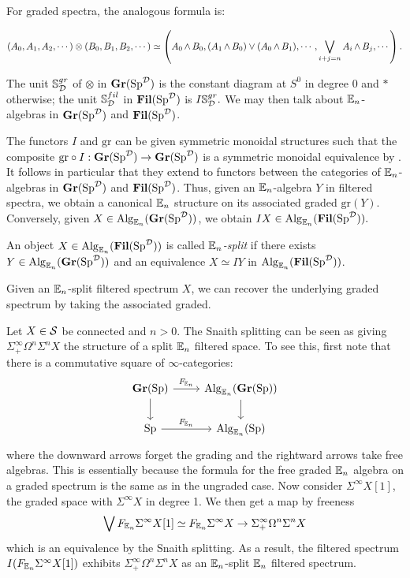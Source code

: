 For graded spectra, the analogous formula is:

$$(A_0,A_1,A_2,\cdots) \otimes (B_0,B_1,B_2,\cdots) \simeq \left( A_0 \smsh B_0, (A_1 \smsh B_0) \vee (A_0 \smsh B_1), \cdots, \bigvee_{i+j=n} A_i \smsh B_j, \cdots \right).$$


The unit $\mathbb{S}^{gr}_{\D}$ of $\otimes$ in $\Gr(\Sp^{\D})$ is the constant diagram at $S^0$ in degree 0 and $*$ otherwise; the unit $\mathbb{S}^{fil}_{\D}$ in $\Fil(\Sp^{\D})$ is $I\mathbb{S}^{gr}_{\D}.$  We may then talk about $\E_n$-algebras in $\Gr(\Sp^{\D})$ and $\Fil(\Sp^{\D})$.  


The functors $I$ and $\text{gr}$ can be given symmetric monoidal structures such that the composite $\text{gr}\circ I : \Gr(\Sp^{\D}) \to \Gr(\Sp^{\D})$ is a symmetric monoidal equivalence by \cite[Proposition 3.2.1]{LurieRot}.  It follows in particular that they extend to functors between the categories of $\E_n$-algebras in $\Gr(\Sp^{\D})$ and $\Fil(\Sp^{\D})$.  Thus, given an $\E_n$-algebra $Y$ in filtered spectra, we obtain a canonical $\E_n$ structure on its associated graded $\text{gr}(Y).$  Conversely, given $X\in \Alg_{\E_n}(\Gr(\Sp^{\D}))$, we obtain $IX\in \Alg_{\E_n}(\Fil(\Sp^{\D})).$  

\begin{dfn}
An object $X\in \Alg_{\E_n}(\Fil(\Sp^{\D}))$ is called \emph{$\E_n$-split} if there exists $Y\in \Alg_{\E_n}(\Gr(\Sp^{\D}))$ and an equivalence $X \simeq IY$ in $\Alg_{\E_n}(\Fil(\Sp^{\D}))$.  
\end{dfn}

Given an $\E_n$-split filtered spectrum $X$, we can recover the underlying graded spectrum by taking the associated graded.  

\begin{exm}\label{exm:snaith}
Let $X\in \cS$ be connected and $n>0$.  The Snaith splitting can be seen as giving $\Sigma^{\infty}_+ \Omega^n \Sigma^n X$ the structure of a split $\E_n$ filtered space.  To see this, first note that there is a commutative square of $\infty$-categories:
$$
\begin{tikzcd}
\Gr(\Sp) \arrow[d]\arrow[r,"F_{\E_n}"]&  \Alg_{\E_n}(\Gr(\Sp)) \arrow[d]\\
\Sp \arrow[r,"F_{\E_n}"] & \Alg_{\E_n}(\Sp) 
\end{tikzcd}
$$
where the downward arrows forget the grading and the rightward arrows take free algebras.  This is essentially because the formula for the free graded $\E_n$ algebra on a graded spectrum is the same as in the ungraded case.  Now consider $\Sigma^{\infty}X[1]$, the graded space with $\Sigma^{\infty} X$ in degree 1.  We then get a map by freeness $$\bigvee F_{\E_n} \Sigma^{\infty} X[1] \simeq  F_{\E_n} \Sigma^{\infty} X \to \Sigma^{\infty}_+ \Omega^n \Sigma^n X$$ which is an equivalence by the Snaith splitting.  As a result, the filtered spectrum $I(F_{\E_n} \Sigma^{\infty} X[1])$ exhibits $\Sigma^{\infty}_+ \Omega^n \Sigma^n X$ as an $\E_n$-split $\E_n$ filtered spectrum.  
\end{exm}

